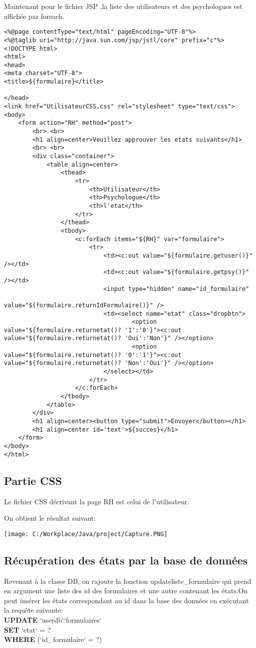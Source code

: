 \documentclass[12]{article}
\begin{document}
Maintenant pour le fichier JSP ,la liste des utilisateurs et des psychologues est affichée par foreach.
\begin{scriptsize}

\lstset{language=XML}
\begin{lstlisting}
<%@page contentType="text/html" pageEncoding="UTF-8"%>
<%@taglib uri="http://java.sun.com/jsp/jstl/core" prefix="c"%>
<!DOCTYPE html>
<html>
<head>
<meta charset="UTF-8">
<title>${formulaire}</title>

</head>
<link href="UtilisateurCSS.css" rel="stylesheet" type="text/css">
<body>
	<form action="RH" method="post">
		<br> <br>
		<h1 align=center>Veuillez approuver les etats suivants</h1>
		<br> <br>
		<div class="container">
			<table align=center>
				<thead>
					<tr>
						<th>Utilisateur</th>
						<th>Psychologue</th>
						<th>l'etat</th>
					</tr>
				</thead>
				<tbody>
					<c:forEach items="${RH}" var="formulaire">
						<tr>
							<td><c:out value="${formulaire.getuser()}" /></td>
							<td><c:out value="${formulaire.getpsy()}" /></td>
							<input type="hidden" name="id_formulaire"
								value="${formulaire.returnIdFormulaire()}" />
							<td><select name="etat" class="dropbtn">
									<option value="${formulaire.returnetat()? '1':'0'}"><c:out value="${formulaire.returnetat()? 'Oui':'Non'}" /></option>
									<option value="${formulaire.returnetat()? '0':'1'}"><c:out value="${formulaire.returnetat()? 'Non':'Oui'}" /></option>
							</select></td>
						</tr>
					</c:forEach>
				</tbody>
			</table>
		</div>
		<h1 align=center><button type="submit">Envoyer</button></h1>
		<h1 align=center id='text'>${succes}</h1>
	</form>
</body>
</html>

\end{lstlisting}
\end{scriptsize}
 
\subsection{Partie CSS}
Le fichier CSS décrivant la page RH est celui de l'utilisateur.

On obtient le résultat suivant:

\begin{center}
\texttt{[image: C:/Workplace/Java/project/Capture.PNG]}
\end{center}

\subsection{Récupération des états par la base de données}
Revenant à la classe DB, on rajoute la fonction updateliste\_formulaire qui prend en argument une liste des id des formulaires et une autre contenant les états.On peut insérer les états correspondant au id dans la base des données en exécutant la requête suivante:\\
\textbf{UPDATE} `userdb`.`formulaires` \\
\textbf{SET} `etat` = ? \\
\textbf{WHERE} (`id\_formulaire` = ?)\\
\end{document}
